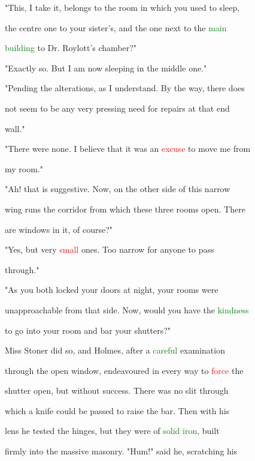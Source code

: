  "This, I take it, belongs to the room in which you used to sleep,

 the centre one to your sister's, and the one next to the \textcolor{green}{main}

 \textcolor{green}{building} to Dr. Roylott's chamber?"



 "Exactly so. But I am now sleeping in the middle one."



 "Pending the alterations, as I understand. By the way, there does

 not seem to be any very pressing need for repairs at that end

 wall."



 "There were none. I believe that it was an \textcolor{red}{excuse} to move me from

 my room."



 "Ah! that is suggestive. Now, on the other side of this narrow

 wing runs the corridor from which these three rooms open. There

 are windows in it, of course?"



 "Yes, but very \textcolor{red}{small} ones. Too narrow for anyone to pass

 through."



 "As you both locked your doors at night, your rooms were

 unapproachable from that side. Now, would you have the \textcolor{green}{kindness}

 to go into your room and bar your shutters?"



 Miss Stoner did so, and Holmes, after a \textcolor{green}{careful} \textcolor{BurntOrange}{examination}

 through the open window, endeavoured in every way to \textcolor{red}{force} the

 shutter open, but without \textcolor{BurntOrange}{success.} There was no slit through

 which a knife could be passed to raise the bar. Then with his

 lens he tested the hinges, but they were of \textcolor{green}{solid} \textcolor{green}{iron,} built

 firmly into the massive masonry. "Hum!" said he, scratching his

